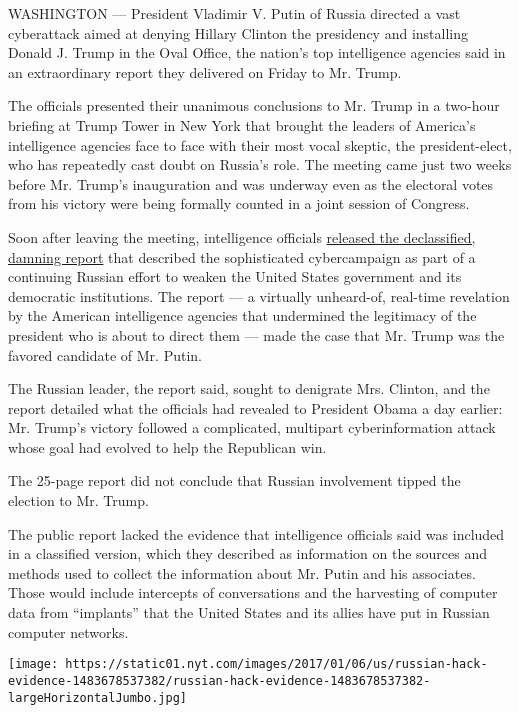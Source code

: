 WASHINGTON --- President Vladimir V. Putin of Russia directed a vast
cyberattack aimed at denying Hillary Clinton the presidency and
installing Donald J. Trump in the Oval Office, the nation's top
intelligence agencies said in an extraordinary report they delivered on
Friday to Mr. Trump.

The officials presented their unanimous conclusions to Mr. Trump in a
two-hour briefing at Trump Tower in New York that brought the leaders of
America's intelligence agencies face to face with their most vocal
skeptic, the president-elect, who has repeatedly cast doubt on Russia's
role. The meeting came just two weeks before Mr. Trump's inauguration
and was underway even as the electoral votes from his victory were being
formally counted in a joint session of Congress.

Soon after leaving the meeting, intelligence officials
\href{http://www.nytimes.com/interactive/2017/01/06/us/politics/document-russia-hacking-report-intelligence-agencies.html?_r=0}{released
the declassified, damning report} that described the sophisticated
cybercampaign as part of a continuing Russian effort to weaken the
United States government and its democratic institutions. The report ---
a virtually unheard-of, real-time revelation by the American
intelligence agencies that undermined the legitimacy of the president
who is about to direct them --- made the case that Mr. Trump was the
favored candidate of Mr. Putin.

The Russian leader, the report said, sought to denigrate Mrs. Clinton,
and the report detailed what the officials had revealed to President
Obama a day earlier: Mr. Trump's victory followed a complicated,
multipart cyberinformation attack whose goal had evolved to help the
Republican win.

The 25-page report did not conclude that Russian involvement tipped the
election to Mr. Trump.

The public report lacked the evidence that intelligence officials said
was included in a classified version, which they described as
information on the sources and methods used to collect the information
about Mr. Putin and his associates. Those would include intercepts of
conversations and the harvesting of computer data from ``implants'' that
the United States and its allies have put in Russian computer networks.

\href{https://www.nytimes.com/interactive/2017/01/06/us/russian-hack-evidence.html}{}

\texttt{[image: https://static01.nyt.com/images/2017/01/06/us/russian-hack-evidence-1483678537382/russian-hack-evidence-1483678537382-largeHorizontalJumbo.jpg]}

